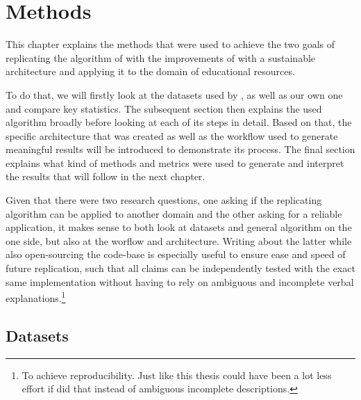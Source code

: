 \chapter{Methods}


This chapter explains the methods that were used to achieve the two goals of replicating the algorithm of \textcite{Derrac2015} with the improvements of \cite{Ager2018,Alshaikh2020} with a sustainable architecture and applying it to the domain of educational resources.  

To do that, we will firstly look at the datasets used by \mainalgos, as well as our own one and compare key statistics. The subsequent section then explains the used algorithm broadly before looking at each of its steps in detail. Based on that, the specific architecture that was created as well as the workflow used to generate meaningful results will be introduced to demonstrate its process. The final section explains what kind of methods and metrics were used to generate and interpret the results that will follow in the next chapter.

Given that there were two research questions, one asking if the replicating algorithm can be applied to another domain and the other asking for a reliable application, it makes sense to both look at datasets and general algorithm on the one side, but also at the worflow and architecture. Writing about the latter while also open-sourcing the code-base is especially useful to ensure ease and speed of future replication, such that all claims can be independently tested with the exact same implementation without having to rely on ambiguous and incomplete verbal explanations.\footnote{To achieve reproducibility. Just like this thesis could have been a lot less effort if \mainalgos did that instead of ambiguous incomplete descriptions.}




\section{Datasets}

